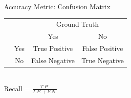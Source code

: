 \documentclass[usenames,dvipsnames]{beamer}
\begin{document}
\begin{frame}{Accuracy Metric: Confusion Matrix}
\begin{center}
	\begin{tabular}{@{}cc cc@{}}
		\multicolumn{1}{c}{} &\multicolumn{1}{c}{} &\multicolumn{2}{c}{Ground Truth} \\ 
		\cmidrule(lr){3-4}
		\multicolumn{1}{c}{} & 
		\multicolumn{1}{c}{} & 
		\multicolumn{1}{c}{Yes} & 
		\multicolumn{1}{c}{No} \\ 
		\cline{2-4}
		\multirow[c]{2}{*}{\rotatebox[origin=tr]{90}{Predicted}}
		
		& Yes  & \cellcolor{blue!50}True Positive &False Positive   \\[1.5ex]
		& No  &  \cellcolor{blue!25}False Negative   & True Negative \\ 
		\cline{2-4}
	\end{tabular}\\
	
	\vspace{30pt}
	Recall = $\frac{T.P.}{T.P. + F.N.}$
\end{center}
\end{frame}


%
%
\end{document}
